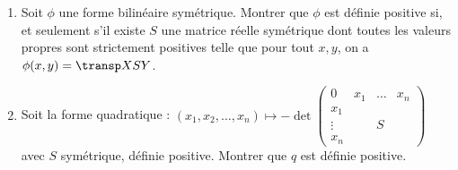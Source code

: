 \begin{enonce}
\begin{exercise}[ID={RMS124 E660 Mines-Ponts PSI},subtitle={},tags={}, difficulty={0}]
\begin{enumerate}
  \item Soit $\phi$ une forme bilinéaire symétrique.
  Montrer que $\phi$ est définie positive si, et seulement s'il existe $S$ une matrice réelle symétrique dont toutes les valeurs propres sont strictement positives telle que pour tout $x,y$, on a $\phi(x,y)=\transp X S Y$.
\item Soit la forme quadratique :
  \begin{math}
    (x_1, x_2,\dots, x_n) \mapsto
    - \det \begin{pmatrix}
    0 & x_1 & \dots & x_n\\
    x_1 &&&\\
    \vdots & & S & \\
    x_n &&&
    \end{pmatrix}
  \end{math}
  avec $S$ symétrique, définie positive.
  Montrer que $q$ est définie positive.
\end{enumerate}
\end{exercise}
\begin{solution}
\end{solution}
\end{enonce}
